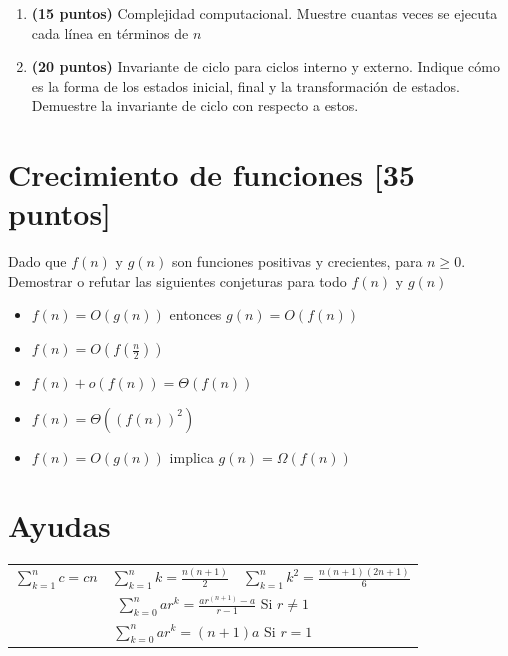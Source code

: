 \documentclass[9pt,twocolumn]{article}
\begin{document}
\begin{enumerate}
	\item \textbf{\textbf{(15 puntos)}} Complejidad computacional. Muestre cuantas veces se ejecuta cada línea en términos de $n$
	\item \textbf{\textbf{(20 puntos)}} Invariante de ciclo para ciclos interno y externo. Indique cómo es la forma de los estados inicial, final y la transformación de estados. Demuestre la invariante de ciclo con respecto a estos. 
\end{enumerate}
\section{Crecimiento de funciones \small{[35 puntos]}} 

Dado que $f(n)$ y $g(n)$ son funciones positivas y crecientes, para $n\geq 0$. Demostrar o refutar las siguientes conjeturas para todo  $f(n)$ y $g(n)$

\begin{itemize}
	\item $f(n) = O(g(n))$ entonces $g(n)=O(f(n))$ 
	\item $f(n) = O(f(\frac{n}{2}))$ 
	\item $f(n) + o(f(n)) = \Theta(f(n))$
	\item $f(n) = \Theta((f(n))^2)$
	\item $f(n) = O(g(n))$ implica $g(n) = \Omega(f(n))$
\end{itemize}


\section*{Ayudas}
\begin{tabular}{ccc}
 $\sum \limits_{k=1}^n c = cn$ & $\sum \limits_{k=1}^n k = \frac{n(n+1)}{2}$ & $\sum \limits_{k=1}^n k^2 = \frac{n(n+1)(2n+1)}{6}$ \\
  \multicolumn{3}{c}{$\sum \limits_{k=0}^n ar^k = \frac{ar^{(n+1)}-a}{r-1}$ Si $r \neq 1$ } \\
 \multicolumn{3}{c}{$\sum \limits_{k=0}^n ar^k = (n+1)a$ Si $r = 1$ } 
\end{tabular}
\end{document}
